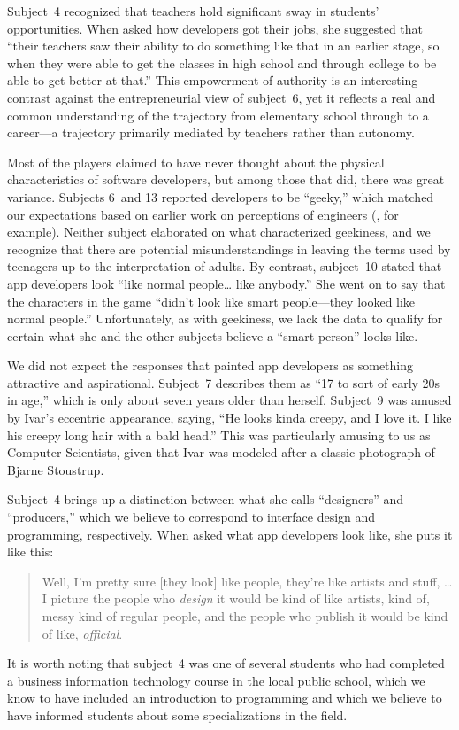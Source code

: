 \documentclass[letterpaper]{article}
\begin{document}
Subject~4 recognized that teachers hold significant sway in students'
opportunities. When asked how developers got their jobs, she suggested
that ``their teachers saw their ability to do something
like that in an earlier stage, so when they were able to get
the classes in high school and through college to be able to get better
at that.''
This empowerment of authority is an interesting contrast
against the entrepreneurial view of subject~6,
yet it reflects a real and common understanding of the trajectory
from elementary school through to a career---a trajectory primarily
mediated by teachers rather than autonomy.


Most of the players claimed to have never thought about the physical
characteristics of software developers, but among those that did,
there was great variance.  Subjects 6~and 13 reported developers to be
``geeky,'' which matched our expectations based on earlier work on
perceptions of engineers (\citet{Margolis2003}, for example). Neither
subject elaborated on what characterized geekiness, and we recognize
that there are potential misunderstandings in leaving the terms used
by teenagers up to the interpretation of adults.  
By contrast,
subject~10 stated that app developers look ``like normal
people\ldots{} like anybody.''
She went on to say that the characters in the game
``didn't look like smart people---they looked like normal people.''
Unfortunately, as with geekiness, we lack the data to qualify
for certain what she and the other subjects believe a ``smart person'' looks
like.

We did not expect the responses that painted app developers as something
attractive and aspirational. Subject~7 describes them as ``17 to sort of
early 20s in age,'' which is only about seven years older than herself.
Subject~9 was amused by Ivar's eccentric appearance, saying, ``He looks
kinda creepy, and I love it. I like his creepy long hair with a bald head.''
This was particularly amusing to us as Computer Scientists, given that
Ivar was modeled after a classic photograph of Bjarne Stoustrup.

Subject~4 brings up a distinction between what she calls ``designers''
and ``producers,'' which we believe to correspond to interface
design and programming, respectively.
When asked what app developers look like, she puts it like this:
\begin{quote}
Well, I'm pretty sure [they look] like people, they're like artists
and stuff, \ldots{} I picture the people who \textit{design} it would
be kind of like artists, kind of, messy kind of regular people, and the
people who publish it would be kind of like, \textit{official}.
\end{quote}
It is worth noting that subject~4 was one of several students who had
completed a business information technology course in the local public
school, which we know to have included an introduction to programming
and which we believe to have informed students about some
specializations in the field.
\end{document}

